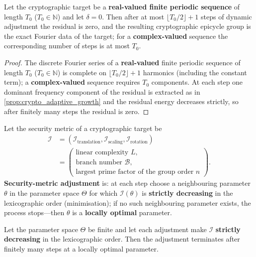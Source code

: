 \begin{theorem}\label{thm:crypto_adaptive_convergence}
Let the cryptographic target be a \textbf{real-valued finite periodic sequence} of length $T_0$ ($T_0\in\mathbb N$) and let $\delta=0$. Then after at most $\lfloor T_0/2\rfloor+1$ steps of dynamic adjustment the residual is zero, and the resulting cryptographic epicycle group is the exact Fourier data of the target; for a \textbf{complex-valued} sequence the corresponding number of steps is at most $T_0$.
\end{theorem}

\begin{proof}
The discrete Fourier series of a \textbf{real-valued} finite periodic sequence of length $T_0$ ($T_0\in\mathbb N$) is complete on $\lfloor T_0/2\rfloor+1$ harmonics (including the constant term); a \textbf{complex-valued} sequence requires $T_0$ components. At each step one dominant frequency component of the residual is extracted as in \cref{prop:crypto_adaptive_growth} and the residual energy decreases strictly, so after finitely many steps the residual is zero.
\end{proof}

\begin{definition}\label{def:crypto_security_metric_adjustment}
Let the security metric of a cryptographic target be
\[
\begin{aligned}
\mathcal I
&=(\mathcal I_{\mathrm{translation}},\mathcal I_{\mathrm{scaling}},\mathcal I_{\mathrm{rotation}})\\
&=\left(\begin{array}{l}
\text{linear complexity }L,\\
\text{branch number }\mathcal B,\\
\text{largest prime factor of the group order }n
\end{array}\right).
\end{aligned}
\]
\textbf{Security-metric adjustment} is: at each step choose a neighbouring parameter $\theta$ in the parameter space $\Theta$ for which $\mathcal I(\theta)$ is \textbf{strictly decreasing} in the lexicographic order (minimisation); if no such neighbouring parameter exists, the process stops---then $\theta$ is a \textbf{locally optimal} parameter.
\end{definition}

\begin{proposition}\label{prop:crypto_security_metric_convergence}
Let the parameter space $\Theta$ be finite and let each adjustment make $\mathcal I$ \textbf{strictly decreasing} in the lexicographic order. Then the adjustment terminates after finitely many steps at a locally optimal parameter.
\end{proposition}

